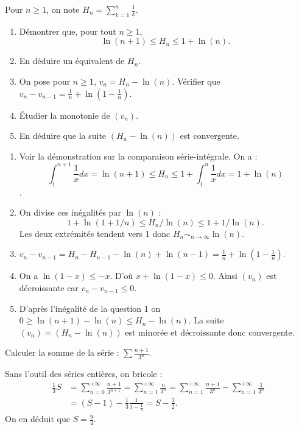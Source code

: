 \documentclass{book}
\begin{document}
\begin{Exercice}
Pour $n\geq 1$, on note $H_n=\sum_{k=1}^n \frac 1k$. 
\begin{enumerate}
\item Démontrer que, pour tout $n\geq 1$, 
$$\ln(n+1)\leq H_n\leq 1+\ln(n).$$
\item En déduire un équivalent de $H_n$.
\item On pose pour $n\geq 1$, $v_n=H_n-\ln(n)$. Vérifier que $v_{n}-v_{n-1}=\frac 1n+\ln\left(1-\frac 1n\right)$.
\item \'Etudier la monotonie de $(v_n)$.
\item En déduire que la suite $(H_n-\ln(n))$ est convergente.
\end{enumerate}
          
\begin{Correction}
    \begin{enumerate}
        \item Voir la démonstration sur la comparaison série-intégrale. On a :
$$ \int_{1}^{n+1}\frac{1}{x}dx=\ln(n+1) \leq H_n \leq 1 + \int_{1}^{n}\frac{1}{x}dx=1 + \ln(n)$$.
\item On divise ces inégalités par $\ln(n)$ :
$$1 + \ln(1+1/n) \leq H_n/\ln(n) \leq 1+1/\ln(n).$$
Les deux extrémités tendent vers 1 donc   $H_n \sim_{n\to\infty} \ln(n).$
\item $v_{n}-v_{n-1}=H_n-H_{n-1}-  \ln(n) + \ln(n-1)= \frac{1}{n}+\ln\left(1-\frac 1n\right).$
\item On a $\ln(1-x)\leq -x$. D'où $x+\ln(1-x)\leq 0$. Ainsi $(v_n)$ est décroissante car $v_{n}-v_{n-1}\leq 0$. 
\item D'après l'inégalité de la question 1 on $0\geq \ln(n+1)-\ln(n)\leq H_n - \ln(n)$. La suite $(v_n)=(H_n-\ln(n))$ est minorée et décroissante donc convergente.
  \end{enumerate}      

\end{Correction}
\end{Exercice}


\begin{Exercice}
Calculer la somme de la série : $\sum \frac{n+1}{3^n}.$
\begin{Correction}
Sans l'outil des séries entières, on bricole :
$$\begin{aligned}
\frac{1}{3}S&=\sum_{n=0}^{+\infty}\frac{n+1}{3^{n+1}}=\sum_{n=1}^{+\infty}\frac{n}{3^{n}}=\sum_{n=1}^{+\infty}\frac{n+1}{3^{n}}-\sum_{n=1}^{+\infty}\frac{1}{3^{n}}\\
 &=(S-1)-\frac{1}{3}\frac{1}{1-\frac{1}{3}}=S-\frac{3}{2}.
\end{aligned}$$
On en déduit que $S=\frac{9}{4}.$
\end{Correction}
\end{Exercice}
\end{document}
